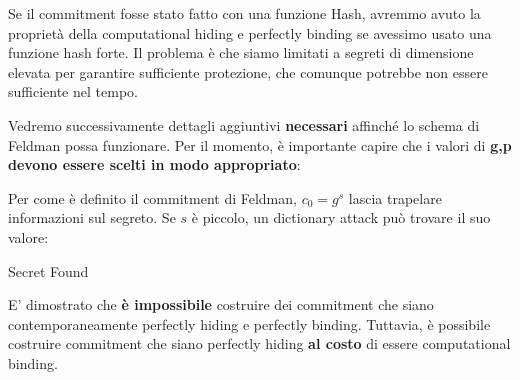 \begin{note}
Se il commitment fosse stato fatto con una funzione Hash, avremmo avuto la proprietà della computational hiding e perfectly binding se avessimo usato una funzione hash forte. Il problema è che siamo limitati a segreti di dimensione elevata per garantire sufficiente protezione, che comunque potrebbe non essere sufficiente nel tempo.
\end{note}
Vedremo successivamente dettagli aggiuntivi \textbf{necessari} affinché lo schema di Feldman possa funzionare. Per il momento, è importante capire che i valori di \textbf{g,p} \textbf{devono essere scelti in modo appropriato}:\\
\begin{remark}
Per come è definito il commitment di Feldman, $c_0=g^s$ lascia trapelare informazioni sul segreto. Se $s$ è piccolo, un dictionary attack può trovare il suo valore:
\begin{algorithmic}[1]
\State Secret Found
\EndIf
\EndFor
\end{algorithmic}
\end{remark}
\begin{note}
E' dimostrato che \textbf{è impossibile} costruire dei commitment che siano contemporaneamente perfectly hiding e perfectly binding. Tuttavia, è possibile costruire commitment che siano perfectly hiding \textbf{al costo} di essere computational binding.
\end{note}\pagebreak

